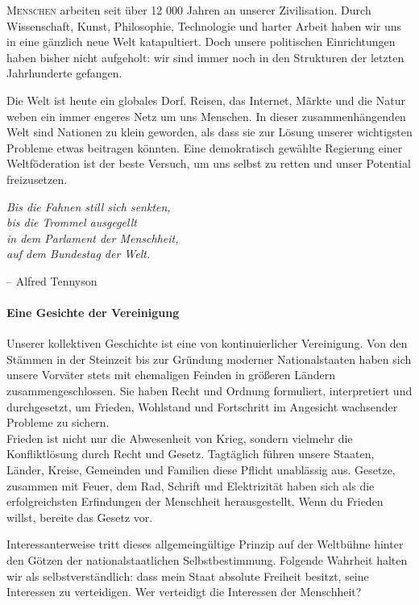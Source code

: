 \documentclass[11pt,a4paper]{article}
\begin{document}
\begin{multicols}{2}
\lettrine[lraise=0.1, lines=2]{\textsc{M}}{enschen} arbeiten seit über 12 000 Jahren an unserer Zivilisation. Durch Wissenschaft, Kunst, Philosophie, Technologie und harter Arbeit haben wir uns in eine gänzlich neue Welt katapultiert. Doch unsere politischen Einrichtungen haben bisher nicht aufgeholt: wir sind immer noch in den Strukturen der letzten Jahrhunderte gefangen.

\noindent Die Welt ist heute ein globales Dorf. Reisen, das Internet, Märkte und die Natur weben ein immer engeres Netz um uns Menschen. In dieser zusammenhängenden Welt sind Nationen zu klein geworden, als dass sie zur Lösung unserer wichtigsten Probleme etwas beitragen könnten. Eine demokratisch gewählte Regierung einer Weltföderation ist der beste Versuch, um uns selbst zu retten und unser Potential freizusetzen.


\begin{shaded*}
\noindent \textit{Bis die Fahnen still sich senkten,\\
bis die Trommel ausgegellt\\
\noindent in dem Parlament der Menschheit, \\
auf dem Bundestag der Welt.}
\begin{flushright}
-- Alfred Tennyson
\end{flushright}
\vspace{-12pt}
\end{shaded*}


\paragraph{Eine Gesichte der Vereinigung}

Unserer kollektiven Geschichte ist eine von kontinuierlicher Vereinigung. Von den Stämmen in der Steinzeit bis zur Gründung moderner Nationalstaaten haben sich unsere Vorväter stets mit ehemaligen Feinden in größeren Ländern zusammengeschlossen. Sie haben Recht und Ordnung formuliert, interpretiert und durchgesetzt, um Frieden, Wohlstand und Fortschritt im Angesicht wachsender Probleme zu sichern.\\
\noindent Frieden ist nicht nur die Abwesenheit von Krieg, sondern vielmehr die Konfliktlösung durch Recht und Gesetz. Tagtäglich führen unsere Staaten, Länder, Kreise, Gemeinden und Familien diese Pflicht unablässig aus. Gesetze, zusammen mit Feuer, dem Rad, Schrift und Elektrizität haben sich als die erfolgreichsten Erfindungen der Menschheit herausgestellt. Wenn du Frieden willst, bereite das Gesetz vor.

\noindent Interessanterweise tritt dieses allgemeingültige Prinzip auf der Weltbühne hinter den Götzen der nationalstaatlichen Selbstbestimmung. Folgende Wahrheit halten wir als selbstverständlich: dass mein Staat absolute Freiheit besitzt, seine Interessen zu verteidigen. Wer verteidigt die Interessen der Menschheit?

\end{multicols}
\end{document}
